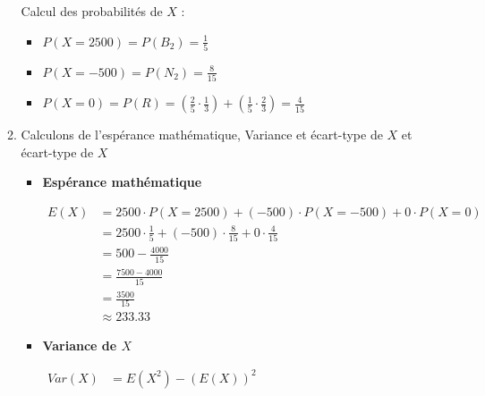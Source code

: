 \documentclass[12pt,a4paper]{article}
\begin{document}
\begin{enumerate}
\begin{enumerate}
                    Calcul des probabilités de $X$ :
                    \begin{itemize}
                        \item $P(X = 2500) = P(B_{2}) = \frac{1}{5}$
                        \item $P(X = -500) = P(N_{2}) = \frac{8}{15}$
                        \item $P(X = 0) = P(R) = \left( \frac{2}{5} \cdot \frac{1}{3} \right) + \left( \frac{1}{5} \cdot \frac{2}{3} \right) = \frac{4}{15}$
                    \end{itemize}

              \item Calculons de l'espérance mathématique, Variance et écart-type de $X$ et écart-type de $X$
                    \begin{itemize}
                        \item \textbf{Espérance mathématique}

                              \(
                              \begin{aligned}
                                  E(X) & = 2500 \cdot P(X = 2500) + (-500) \cdot P(X = -500) + 0 \cdot P(X = 0)      \\
                                       & = 2500 \cdot \frac{1}{5} + (-500) \cdot \frac{8}{15} + 0 \cdot \frac{4}{15} \\
                                       & = 500 - \frac{4000}{15}                                                     \\
                                       & = \frac{7500 - 4000}{15}                                                    \\
                                       & =\frac{3500}{15}                                                            \\
                                       & \approx 233.33
                              \end{aligned}
                              \)

                        \item \textbf{Variance de $X$}

                              \(
                              \begin{aligned}
                                  Var(X) & = E(X^2) - (E(X))^2 \\
                              \end{aligned}
                              \)


\end{itemize}
\end{enumerate}
\end{enumerate}
\end{document}
